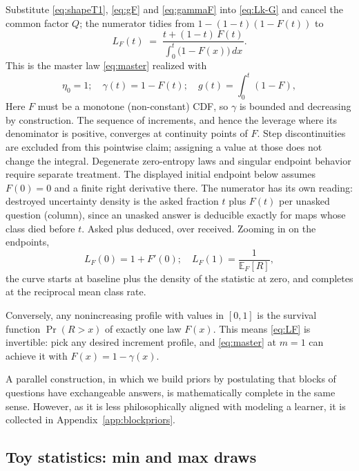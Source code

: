 \documentclass[11pt]{article}
\begin{document}
Substitute \eqref{eq:shapeT1}, \eqref{eq:gF} and \eqref{eq:gammaF}
into \eqref{eq:Lk-G} and cancel the common factor $Q$; the numerator
tidies from $1 - (1-t)(1-F(t))$ to
%
\begin{equation}
  L_F(t)
  \;=\; \frac{t + (1-t)\,F(t)}
  {\displaystyle\int_0^t \big(1 - F(x)\big)\, dx} .
  \label{eq:LF}
\end{equation}
%
This is the master law \eqref{eq:master} realized with 
\begin{equation}
  \eta_0 = 1;\quad \gamma(t) = 1 - F(t); \quad g(t) = \int_0^t(1-F),
\end{equation}
Here $F$ must be a monotone (non-constant) CDF, so $\gamma$ is bounded and
decreasing by construction. The sequence of increments, and hence
the leverage where its denominator is positive, converges at
continuity points of $F$. Step discontinuities are excluded from
this pointwise claim; assigning a value at those does not change the
integral. Degenerate zero-entropy laws and singular endpoint behavior
require separate treatment. The displayed initial endpoint below assumes
$F(0)=0$ and a finite right derivative there. The numerator has its own reading: destroyed uncertainty density is
the asked fraction $t$ plus $F(t)$ per unasked question (column), since an
unasked answer is deducible exactly for maps whose class died before $t$.
Asked plus deduced, over received. Zooming in on the endpoints,
\begin{equation}
  L_F(0) = 1 + F'(0);\quad L_F(1) = \frac 1{\mathbb E_F[R]},
\end{equation}
the curve
starts at baseline plus the density of the statistic at zero, and
completes at the reciprocal mean class rate. 

Conversely, any nonincreasing
profile with values in $[0,1]$ is the survival function $\Pr(R>x)$ of exactly
one law $F(x)$. This means \eqref{eq:LF} is invertible: pick any desired increment profile, and
\eqref{eq:master} at $m = 1$ can achieve it with $F(x) = 1- \gamma(x)$.

A parallel construction, in which we build priors by postulating that blocks of questions have exchangeable answers,
is mathematically complete in the same sense. However, as it is less philosophically aligned with
modeling a learner, it is collected in Appendix~\ref{app:blockpriors}.

\subsection{Toy statistics: min and max draws}
\end{document}
